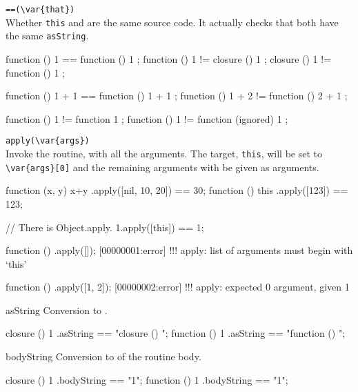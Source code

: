 \begin{urbiscriptapi}
\item \lstinline|==(\var{that})|\\
  Whether \lstinline|this| and  are the same source code.
  It actually checks that both have the same \lstinline|asString|.
\begin{urbiassert}
function () { 1 } == function () { 1 };
function () { 1 } != closure  () { 1 };
closure  () { 1 } != function () { 1 };

function () { 1 + 1 } == function () { 1 + 1 };
function () { 1 + 2 } != function () { 2 + 1 };

function () { 1 } != function { 1 };
function () { 1 } != function (ignored) { 1 };
\end{urbiassert}

\item \lstinline|apply(\var{args})|\\
  Invoke the routine, with all the arguments.  The target,
  \lstinline|this|, will be set to \lstinline|\var{args}[0]| and the
  remaining arguments with be given as arguments.
\begin{urbiassert}
function (x, y) { x+y }.apply([nil, 10, 20]) == 30;
function () { this }.apply([123]) == 123;

// There is Object.apply.
1.apply([this]) == 1;
\end{urbiassert}
\begin{urbiscript}
function () {}.apply([]);
[00000001:error] !!! apply: list of arguments must begin with `this'

function () {}.apply([1, 2]);
[00000002:error] !!! apply: expected 0 argument, given 1
\end{urbiscript}

\item[asString]
  Conversion to .
\begin{urbiassert}
closure  () { 1 }.asString == "closure () {\n}";
function () { 1 }.asString == "function () {\n}";
\end{urbiassert}

\item[bodyString]
  Conversion to  of the routine body.
\begin{urbiassert}
closure  () { 1 }.bodyString == "1";
function () { 1 }.bodyString == "1";
\end{urbiassert}

\end{urbiscriptapi}

